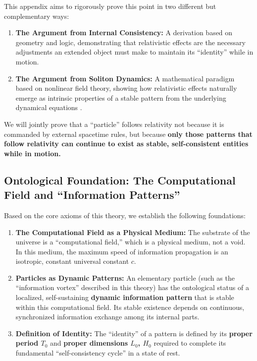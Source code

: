 \documentclass[11pt, a4paper]{article}
\begin{document}
This appendix aims to rigorously prove this point in two different but complementary ways:

\begin{enumerate}
    \item \textbf{The Argument from Internal Consistency:} A derivation based on geometry and logic, demonstrating that relativistic effects are the necessary adjustments an extended object must make to maintain its ``identity'' while in motion.
    \item \textbf{The Argument from Soliton Dynamics:} A mathematical paradigm based on nonlinear field theory, showing how relativistic effects naturally emerge as intrinsic properties of a stable pattern from the underlying dynamical equations \cite{DrazinJohnson1989}.
\end{enumerate}

We will jointly prove that a ``particle'' follows relativity not because it is commanded by external spacetime rules, but because \textbf{only those patterns that follow relativity can continue to exist as stable, self-consistent entities while in motion.}

\subsection{Ontological Foundation: The Computational Field and ``Information Patterns''}

Based on the core axioms of this theory, we establish the following foundations:

\begin{enumerate}
    \item \textbf{The Computational Field as a Physical Medium:} The substrate of the universe is a ``computational field,'' which is a physical medium, not a void. In this medium, the maximum speed of information propagation is an isotropic, constant universal constant $c$.
    \item \textbf{Particles as Dynamic Patterns:} An elementary particle (such as the ``information vortex'' described in this theory) has the ontological status of a localized, self-sustaining \textbf{dynamic information pattern} that is stable within this computational field. Its stable existence depends on continuous, synchronized information exchange among its internal parts.
    \item \textbf{Definition of Identity:} The ``identity'' of a pattern is defined by its \textbf{proper period $T_0$} and \textbf{proper dimensions $L_0$, $H_0$} required to complete its fundamental ``self-consistency cycle'' in a state of rest.
\end{enumerate}
\end{document}

